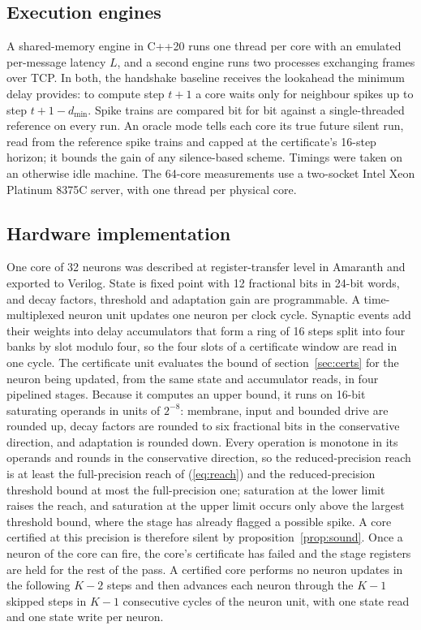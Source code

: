 \documentclass{iopjournal}
\begin{document}
\subsection{Execution engines}

A shared-memory engine in C++20 runs one thread per core with an emulated per-message latency $L$, and a second engine runs two processes exchanging frames over TCP. In both, the handshake baseline receives the lookahead the minimum delay provides: to compute step $t+1$ a core waits only for neighbour spikes up to step $t+1-d_{\min}$. Spike trains are compared bit for bit against a single-threaded reference on every run. An oracle mode tells each core its true future silent run, read from the reference spike trains and capped at the certificate's 16-step horizon; it bounds the gain of any silence-based scheme. Timings were taken on an otherwise idle machine. The 64-core measurements use a two-socket Intel Xeon Platinum 8375C server, with one thread per physical core.

\subsection{Hardware implementation}
\label{sec:hwmethods}

One core of 32 neurons was described at register-transfer level in Amaranth and exported to Verilog. State is fixed point with 12 fractional bits in 24-bit words, and decay factors, threshold and adaptation gain are programmable. A time-multiplexed neuron unit updates one neuron per clock cycle. Synaptic events add their weights into delay accumulators that form a ring of 16 steps split into four banks by slot modulo four, so the four slots of a certificate window are read in one cycle. The certificate unit evaluates the bound of section~\ref{sec:certs} for the neuron being updated, from the same state and accumulator reads, in four pipelined stages. Because it computes an upper bound, it runs on 16-bit saturating operands in units of $2^{-8}$: membrane, input and bounded drive are rounded up, decay factors are rounded to six fractional bits in the conservative direction, and adaptation is rounded down. Every operation is monotone in its operands and rounds in the conservative direction, so the reduced-precision reach is at least the full-precision reach of (\ref{eq:reach}) and the reduced-precision threshold bound at most the full-precision one; saturation at the lower limit raises the reach, and saturation at the upper limit occurs only above the largest threshold bound, where the stage has already flagged a possible spike. A core certified at this precision is therefore silent by proposition~\ref{prop:sound}. Once a neuron of the core can fire, the core's certificate has failed and the stage registers are held for the rest of the pass. A certified core performs no neuron updates in the following $K-2$ steps and then advances each neuron through the $K-1$ skipped steps in $K-1$ consecutive cycles of the neuron unit, with one state read and one state write per neuron.
\end{document}
